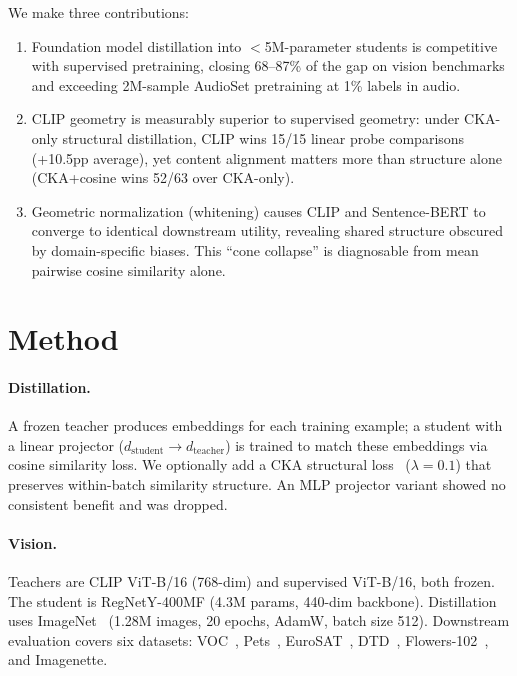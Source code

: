 \documentclass{article}
\begin{document}
We make three contributions:
\begin{enumerate}
    \item Foundation model distillation into $<$5M-parameter students is competitive with supervised pretraining, closing 68--87\% of the gap on vision benchmarks and exceeding 2M-sample AudioSet pretraining at 1\% labels in audio.
    \item CLIP geometry is measurably superior to supervised geometry: under CKA-only structural distillation, CLIP wins 15/15 linear probe comparisons (+10.5pp average), yet content alignment matters more than structure alone (CKA+cosine wins 52/63 over CKA-only).
    \item Geometric normalization (whitening) causes CLIP and Sentence-BERT to converge to identical downstream utility, revealing shared structure obscured by domain-specific biases. This ``cone collapse'' is diagnosable from mean pairwise cosine similarity alone.
\end{enumerate}

\section{Method}
\label{sec:method}

\paragraph{Distillation.}
A frozen teacher produces embeddings for each training example; a student with a linear projector ($d_\text{student} \to d_\text{teacher}$) is trained to match these embeddings via cosine similarity loss.
We optionally add a CKA structural loss~\citep{kornblith2019similarity} ($\lambda{=}0.1$) that preserves within-batch similarity structure.
An MLP projector variant showed no consistent benefit and was dropped.

\paragraph{Vision.}
Teachers are CLIP ViT-B/16 (768-dim) and supervised ViT-B/16, both frozen.
The student is RegNetY-400MF (4.3M params, 440-dim backbone).
Distillation uses ImageNet~\citep{deng2009imagenet} (1.28M images, 20 epochs, AdamW, batch size 512).
Downstream evaluation covers six datasets: VOC~\citep{everingham2010pascal}, Pets~\citep{parkhi2012cats}, EuroSAT~\citep{helber2019eurosat}, DTD~\citep{cimpoi2014describing}, Flowers-102~\citep{nilsback2008automated}, and Imagenette.
\end{document}
